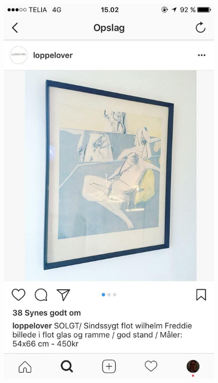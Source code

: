\begin{figure}[H]
\begin{minipage}[b]{0.285\linewidth}
    \includegraphics[width=\linewidth]{Appendix/ScreenshotsCompetitorsPlatforms/instapost.jpg}
    \label{InstaPost}
  \end{minipage}
\end{figure}